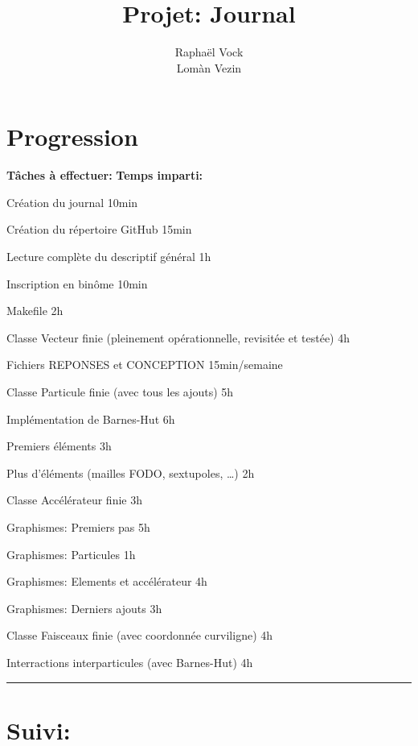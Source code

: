 \documentclass[12pt, letterpaper, twoside]{article}
\title{Projet: Journal}
\author{Raphaël Vock \\ Lomàn Vezin}
\newcommand{\cmark}{\ding{51}}%
\newcommand{\done}{\rlap{$\square$}{\raisebox{2pt}{\large\hspace{1pt}\cmark}}%
\hspace{-2.5pt}}
\begin{document}
\maketitle

\section{Progression} 

\textbf{Tâches à effectuer:} \hfill \textbf{Temps imparti:}
\ \linebreak

\begin{todolist}
	\item[\done] Création du journal \hfill 10min 
	\item[\done] Création du répertoire GitHub \hfill 15min 
	\item[\done] Lecture complète du descriptif général \hfill 1h 
	\item[\done] Inscription en binôme \hfill 10min 
	\item[\done] Makefile \hfill 2h 
	\item[\done] Classe Vecteur finie (pleinement opérationnelle, revisitée et testée) \hfill 4h 
	\item[\done] Fichiers REPONSES et CONCEPTION \hfill 15min/semaine 
	\item[\done] Classe Particule finie (avec tous les ajouts) \hfill 5h 
	\item[\done] Implémentation de Barnes-Hut \hfill 6h 
	\item[\done] Premiers éléments \hfill 3h
	\item[\done] Plus d'éléments (mailles FODO, sextupoles, \ldots) \hfill 2h
	\item[\done] Classe Accélérateur finie \hfill 3h
	\item[\done] Graphismes: Premiers pas \hfill 5h
	\item[\done] Graphismes: Particules \hfill 1h
	\item[\done] Graphismes: Elements et accélérateur \hfill 4h
	\item[\done] Graphismes: Derniers ajouts \hfill 3h
	\item[\done] Classe Faisceaux finie (avec coordonnée curviligne) \hfill 4h
	\item[\done] Interractions interparticules (avec Barnes-Hut) \hfill 4h
\end{todolist}

\rule{\textwidth}{0.4pt}

\section{Suivi:}
\end{document}
